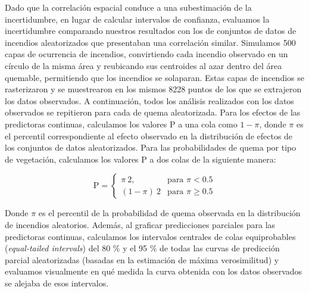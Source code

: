 Dado que la correlación espacial conduce a una subestimación de la incertidumbre, en lugar de calcular intervalos de confianza, evaluamos la incertidumbre comparando nuestros resultados con los de conjuntos de datos de incendios aleatorizados que presentaban una correlación similar. Simulamos 500 capas de ocurrencia de incendios, convirtiendo cada incendio observado en un círculo de la misma área y reubicando sus centroides al azar dentro del área quemable, permitiendo que los incendios se solaparan. Estas capas de incendios se rasterizaron y se muestrearon en los mismos 8228 puntos de los que se extrajeron los datos observados. A continuación, todos los análisis realizados con los datos observados se repitieron para cada de quema aleatorizada. Para los efectos de las predictoras continuas, calculamos los valores P a una cola como $1 - \pi$, donde $\pi$ es el percentil correspondiente al efecto observado en la distribución de efectos de los conjuntos de datos aleatorizados. Para las probabilidades de quema por tipo de vegetación, calculamos los valores P a dos colas de la siguiente manera: 

\begin{equation}
    \text{P} = 
    \begin{cases}
        \pi \ 2, & \text{para } \pi < 0.5 \\
        (1-\pi) \ 2 & \text{para } \pi \ge 0.5 
    \end{cases}
\label{eq:p-value}
\end{equation}

Donde $\pi$ es el percentil de la probabilidad de quema observada en la distribución de incendios aleatorios. Además, al graficar predicciones parciales para las predictoras continuas, calculamos los intervalos centrales de colas equiprobables (\textit{equal-tailed intervals}) del 80 \% y el 95 \% de todas las curvas de predicción parcial aleatorizadas (basadas en la estimación de máxima verosimilitud) y evaluamos visualmente en qué medida la curva obtenida con los datos observados se alejaba de esos intervalos.